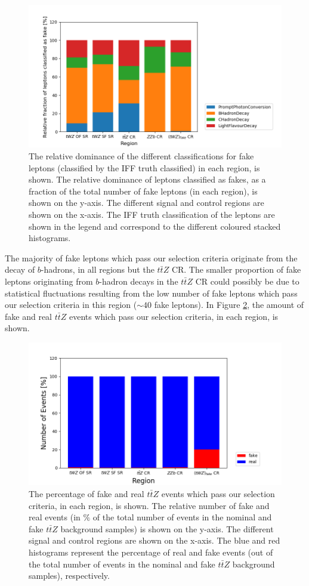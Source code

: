 \begin{figure}[htbp]
\centering

    \includegraphics[width=.55\textwidth]{figures/iff_bar_2.png}   

    \caption{The relative dominance of the different classifications for fake leptons (classified by the IFF truth classified) in each region, is shown. The relative dominance of leptons classified as fakes, as a fraction of the total number of fake leptons (in each region), is shown on the y-axis. The different signal and control regions are shown on the x-axis. The IFF truth classification of the leptons are shown in the legend and correspond to the different coloured stacked histograms.}
  \label{fig:4lep-iff-bar2}
\end{figure}
The majority of fake leptons which pass our selection criteria originate from the decay of $b$-hadrons, in all regions but the $t\bar{t}Z$ CR. The smaller proportion of fake leptons originating from $b$-hadron decays in the $t\bar{t}Z$ CR could possibly be due to statistical fluctuations resulting from the low number of fake leptons which pass our selection criteria in this region ($\sim 40$ fake leptons). In Figure \ref{fig:4lep-iff-bar3}, the amount of fake and real $t\bar{t}Z$ events which pass our selection criteria, in each region, is shown.

\begin{figure}[htbp]
\centering

    \includegraphics[width=.55\textwidth]{figures/iff_bar_3.png}   

    \caption{The percentage of fake and real $t\bar{t}Z$ events which pass our selection criteria, in each region, is shown. The relative number of fake and real events (in $\%$ of the total number of events in the nominal and fake $t\bar{t}Z$ background samples) is shown on the y-axis. The different signal and control regions are shown on the x-axis. The blue and red histograms represent the percentage of real and fake events (out of the total number of events in the nominal and fake $t\bar{t}Z$ background samples), respectively. }
  \label{fig:4lep-iff-bar3}
\end{figure}

